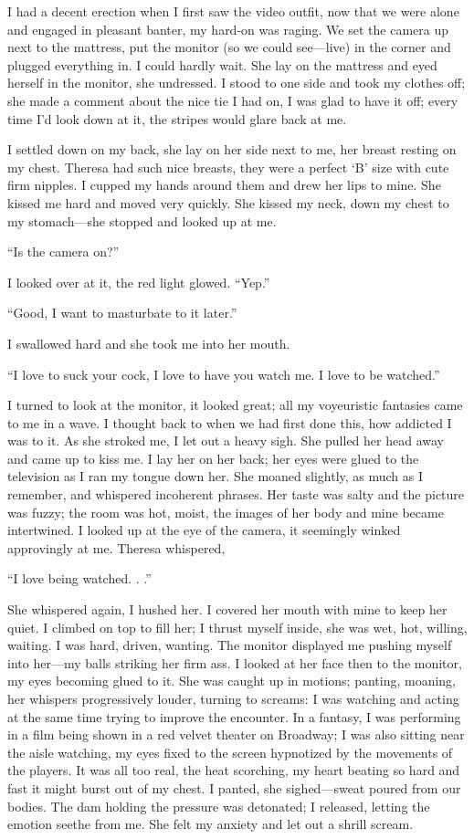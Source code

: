 I had a decent erection when I first saw the video outfit, now that we
were alone and engaged in pleasant banter, my hard-on was raging. We set
the camera up next to the mattress, put the monitor (so we could
see---live) in the corner and plugged everything in. I could hardly
wait. She lay on the mattress and eyed herself in the monitor, she
undressed. I stood to one side and took my clothes off; she made a
comment about the nice tie I had on, I was glad to have it off; every
time I'd look down at it, the stripes would glare back at me.

I settled down on my back, she lay on her side next to me, her breast
resting on my chest. Theresa had such nice breasts, they were a perfect
`B' size with cute firm nipples. I cupped my hands around them and drew
her lips to mine. She kissed me hard and moved very quickly. She kissed
my neck, down my chest to my stomach---she stopped and looked up at me.

``Is the camera on?''

I looked over at it, the red light glowed. ``Yep.''

``Good, I want to masturbate to it later.''

I swallowed hard and she took me into her mouth.

``I love to suck your cock, I love to have you watch me. I love to be
watched.''

I turned to look at the monitor, it looked great; all my voyeuristic
fantasies came to me in a wave. I thought back to when we had first done
this, how addicted I was to it. As she stroked me, I let out a heavy
sigh. She pulled her head away and came up to kiss me. I lay her on her
back; her eyes were glued to the television as I ran my tongue down her.
She moaned slightly, as much as I remember, and whispered incoherent
phrases. Her taste was salty and the picture was fuzzy; the room was
hot, moist, the images of her body and mine became intertwined. I looked
up at the eye of the camera, it seemingly winked approvingly at me.
Theresa whispered,

``I love being watched. . .''

She whispered again, I hushed her. I covered her mouth with mine to keep
her quiet. I climbed on top to fill her; I thrust myself inside, she was
wet, hot, willing, waiting. I was hard, driven, wanting. The monitor
displayed me pushing myself into her---my balls striking her firm ass. I
looked at her face then to the monitor, my eyes becoming glued to it.
She was caught up in motions; panting, moaning, her whispers
progressively louder, turning to screams: I was watching and acting at
the same time trying to improve the encounter. In a fantasy, I was
performing in a film being shown in a red velvet theater on Broadway; I
was also sitting near the aisle watching, my eyes fixed to the screen
hypnotized by the movements of the players. It was all too real, the
heat scorching, my heart beating so hard and fast it might burst out of
my chest. I panted, she sighed---sweat poured from our bodies. The dam
holding the pressure was detonated; I released, letting the emotion
seethe from me. She felt my anxiety and let out a shrill scream.

